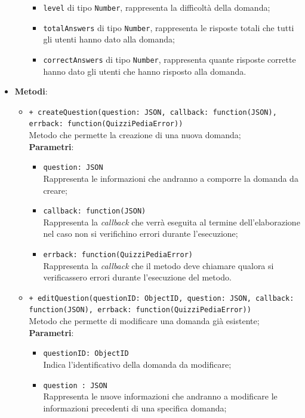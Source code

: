 \begin{itemize}
\begin{itemize}
\begin{itemize}
			\item \texttt{level} di tipo \texttt{Number}, rappresenta la difficoltà della domanda;
			\item \texttt{totalAnswers} di tipo \texttt{Number}, rappresenta le risposte totali che tutti gli utenti hanno dato alla domanda;
			\item \texttt{correctAnswers} di tipo \texttt{Number}, rappresenta quante risposte corrette hanno dato gli utenti che hanno risposto alla domanda.
		\end{itemize}
	\end{itemize}
\item \textbf{Metodi}:
	\begin{itemize}
	\item \texttt{+ createQuestion(question: JSON, callback: function(JSON), errback: function(QuizziPediaError))} \\
	Metodo che permette la creazione di una nuova domanda; \\
		\textbf{Parametri}:
		\begin{itemize}
			\item \texttt{question: JSON} \\
			Rappresenta le informazioni che andranno a comporre la domanda da creare;
			\item \texttt{callback: function(JSON)} \\
			Rappresenta la \textit{callback} che verrà eseguita al termine dell'elaborazione nel caso non si verifichino errori durante l'esecuzione;
			\item \texttt{errback: function(QuizziPediaError)} \\
			Rappresenta la \textit{callback} che il metodo deve chiamare qualora si verificassero errori durante l'esecuzione del metodo.
		\end{itemize}   
	\item \texttt{+ editQuestion(questionID: ObjectID, question: JSON, callback: function(JSON), errback: function(QuizziPediaError))} \\
	Metodo che permette di modificare una domanda già esistente; \\
		\textbf{Parametri}:
		\begin{itemize}
			\item \texttt{questionID: ObjectID} \\
			Indica l'identificativo della domanda da modificare;
			\item \texttt{question : JSON} \\
			Rappresenta le nuove informazioni che andranno a modificare le informazioni precedenti di una specifica domanda;

\end{itemize}
\end{itemize}
\end{itemize}
